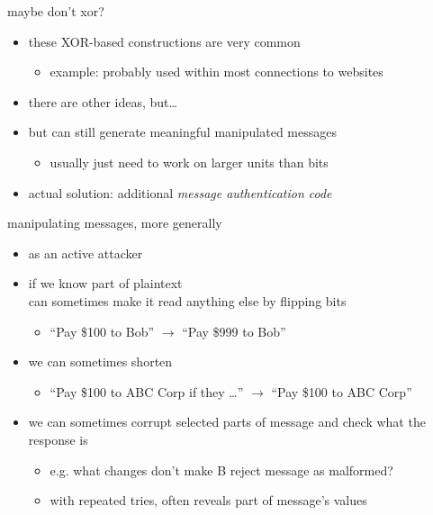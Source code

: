 \begin{frame}{maybe don't xor?}
    \begin{itemize}
    \item these XOR-based constructions are very common 
        \begin{itemize}
        \item example: probably used within most connections to websites
        \end{itemize}
    \item there are other ideas, but\ldots
    \item but can still generate meaningful manipulated messages
        \begin{itemize}
        \item usually just need to work on larger units than bits
        \end{itemize}
    \vspace{.5cm}
    \item actual solution: additional \textit{message authentication code}
    \end{itemize}
\end{frame}

\begin{frame}{manipulating messages, more generally}
\begin{itemize}
\item as an active attacker
\vspace{.5cm}
\item if we know part of plaintext \\
    can sometimes make it read anything else by flipping bits
    \begin{itemize}
    \item ``Pay \$100 to Bob'' $\rightarrow$ ``Pay \$999 to Bob''
    \end{itemize}
\item we can sometimes shorten 
    \begin{itemize}
    \item ``Pay \$100 to ABC Corp if they \ldots'' $\rightarrow$ ``Pay \$100 to ABC Corp''
    \end{itemize}
\item we can sometimes corrupt selected parts of message and check what the response is
    \begin{itemize}
    \item e.g. what changes don't make B reject message as malformed?
    \item with repeated tries, often reveals part of message's values
    \end{itemize}
\end{itemize}
\end{frame}
